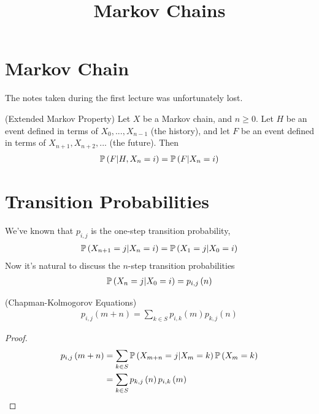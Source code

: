 \documentclass[a4paper]{article}
\begin{document}
\title{Markov Chains}

\maketitle

\newpage

\tableofcontents

\newpage

\section{Markov Chain}
The notes taken during the first lecture was unfortunately lost.

\begin{thm} (Extended Markov Property) Let $X$ be a Markov chain, and $n \geq 0$. Let $H$ be an event defined in terms of $X_0,...,X_{n-1}$ (the history), and let $F$ be an event defined in terms of $X_{n+1},X_{n+2},...$ (the future). Then
\begin{equation*}
\begin{aligned}
\P \left(F|H,X_n = i\right) = \P \left(F|X_n = i\right)
\end{aligned}
\end{equation*}
\end{thm}

\newpage

\section{Transition Probabilities}
We've known that $p_{i,j}$ is the one-step transition probability, 
\begin{equation*}
\begin{aligned}
\P\left(X_{n+1} = j|X_n = i\right) = \P\left(X_1 = j|X_0 = i\right)
\end{aligned}
\end{equation*}
Now it's natural to discuss the $n$-step transition probabilities
\begin{equation*}
\begin{aligned}
\P\left(X_n = j| X_0 = i\right) = p_{i,j}\left(n\right)
\end{aligned}
\end{equation*}

\begin{thm} (Chapman-Kolmogorov Equations)
\begin{equation*}
\begin{aligned}
p_{i,j}\left(m+n\right) = \sum_{k \in S} p_{i,k}\left(m\right)p_{k,j}\left(n\right)
\end{aligned}
\end{equation*}
\begin{proof}
\begin{equation*}
\begin{aligned}
p_{i,j}\left(m+n\right) &= \sum_{k\in S} \P\left(X_{m+n} = j|X_m=k\right) \P\left(X_m=k\right)\\
&= \sum_{k\in S} p_{k,j} \left(n\right) p_{i,k} \left(m\right)
\end{aligned}
\end{equation*}
\end{proof}
\end{thm}
\end{document}
